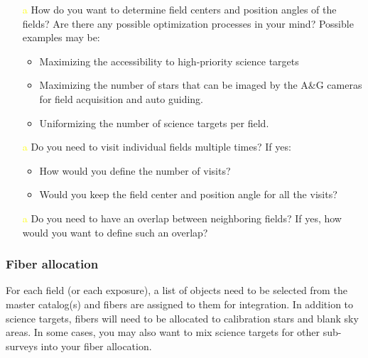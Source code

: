 \documentclass[a4paper,notitlepage]{article}
\newcommand{\colm}[1]{\textcolor{yellow}{#1}}
\begin{document}
\begin{enumerate}
 \item[\colm{a}] How do you want to determine field centers and position
          angles of the fields? Are there any possible optimization
          processes in your mind? Possible examples may be:
          \begin{itemize}
           \item Maximizing the accessibility to high-priority
             science targets
           \item Maximizing the number of stars that can be imaged
             by the A\&G cameras for field acquisition and auto
             guiding.
           \item Uniformizing the number of science targets per
             field.
          \end{itemize}
 \item[\colm{a}] Do you need to visit individual fields multiple times?
          If yes:
          \begin{itemize}
           \item How would you define the number of visits?
           \item Would you keep the field center and position angle
             for all the visits?
          \end{itemize}
 \item[\colm{a}] Do you need to have an overlap between neighboring
          fields? If yes, how would you want to define such an
          overlap?
\end{enumerate}

\subsubsection{Fiber allocation}

For each field (or each exposure), a list of objects need to be selected
from the master catalog(s) and fibers are assigned to them for
integration. In addition to science targets, fibers will need to be
allocated to calibration stars and blank sky areas. In some cases, you
may also want to mix science targets for other sub-surveys into your
fiber allocation.
\end{document}
